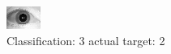 \begin{figure}[h!]
\begin{center}
\includegraphics[width=0.60\columnwidth]{figures/ID1682_class_3_target_2.png}
\end{center}
\caption{ Classification: 3 actual target: 2}
\label{fig:ID1682_class_3_target_2}
\end{figure}
